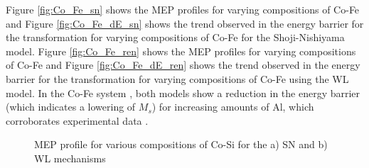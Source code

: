 \documentclass[preprint]{elsarticle}
\begin{document}
 Figure \ref{fig:Co_Fe_sn} shows the MEP profiles for varying compositions of Co-Fe  and Figure \ref{fig:Co_Fe_dE_sn} shows the trend observed in the energy barrier for the transformation for varying compositions of Co-Fe  for the Shoji-Nishiyama  model.
 Figure \ref{fig:Co_Fe_ren} shows the MEP profiles for varying compositions of Co-Fe   and Figure \ref{fig:Co_Fe_dE_ren} shows the trend observed in the energy barrier for the transformation for varying compositions of Co-Fe using the WL model. 
In the Co-Fe system , both models show  a reduction in the energy barrier (which indicates a lowering of $M_s$) for increasing amounts of Al, which corroborates experimental data \cite{ma2010high}.

\begin{figure}[htp!]%
    \centering
\caption{MEP profile for various compositions of Co-Si for the a) SN and b) WL mechanisms}
\label{fig:linear_profile_Co_Si}
  \end{figure}
\end{document}
